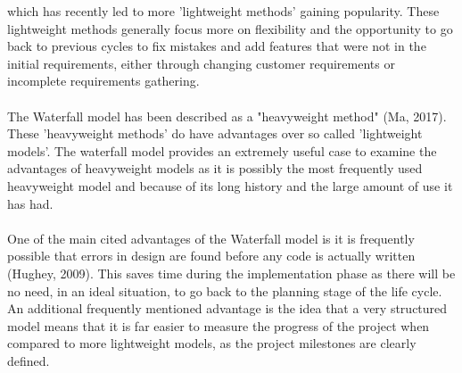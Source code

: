 \documentclass{CRPITStyle}
\begin{document}
		which has recently led to more 'lightweight methods' gaining popularity. These lightweight methods generally focus 
		more on flexibility and the opportunity to go back to previous cycles to fix mistakes and add features that were not
		in the initial requirements, either through changing customer requirements or incomplete requirements gathering.\\
		~\\
		The Waterfall model has been described as a "heavyweight method" (Ma, 2017). These 'heavyweight methods' 
		do have advantages over so called 'lightweight models'. The waterfall model provides an extremely useful case
		to examine the advantages of heavyweight models as it is possibly the most frequently used heavyweight model
		and because of its long history and the large amount of use it has had. \\
		~\\
		One of the main cited advantages of the Waterfall model is it is frequently possible that errors in design are found
		before any code is actually written (Hughey, 2009). This saves time during the implementation phase as 
		there will be no need, in an ideal situation, to go back to the planning stage of the life cycle. An additional frequently
		mentioned advantage is the idea that a very structured model means that it is far easier to measure the progress of the project
		when compared to more lightweight models, as the project milestones are clearly defined.\\
		~\\
\end{document}
